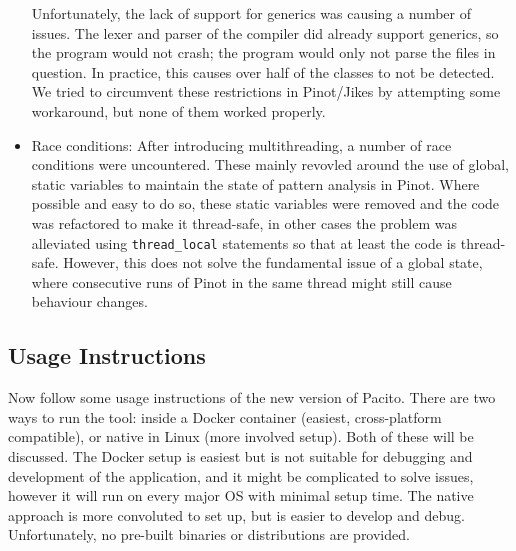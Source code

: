 \begin{itemize}
    Unfortunately, the lack of support for generics was causing a number of issues. The lexer and parser of the compiler did already support generics, so the program would not crash; the program would only not parse the files in question. In practice, this causes over half of the classes to not be detected. We tried to circumvent these restrictions in Pinot/Jikes by attempting some workaround, but none of them worked properly.
    
    \item Race conditions: After introducing multithreading, a number of race conditions were uncountered. These mainly revovled around the use of global, static variables to maintain the state of pattern analysis in Pinot. Where possible and easy to do so, these static variables were removed and the code was refactored to make it thread-safe, in other cases the problem was alleviated using {\tt thread\_local} statements so that at least the code is thread-safe. However, this does not solve the fundamental issue of a global state, where consecutive runs of Pinot in the same thread might still cause behaviour changes.
\end{itemize}

\subsection{Usage Instructions}
Now follow some usage instructions of the new version of Pacito. There are two ways to run the tool: inside a Docker container (easiest, cross-platform compatible), or native in Linux (more involved setup). Both of these will be discussed. The Docker setup is easiest but is not suitable for debugging and development of the application, and it might be complicated to solve issues, however it will run on every major OS with minimal setup time. The native approach is more convoluted to set up, but is easier to develop and debug. Unfortunately, no pre-built binaries or distributions are provided.

